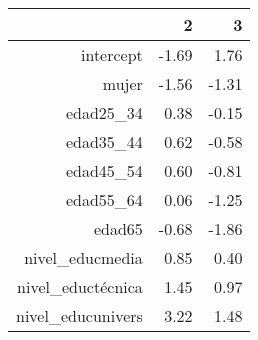 \begin{table}[ht]
\centering
\begin{tabular}{rrr}
  \hline
 & 2 & 3 \\ 
  \hline
intercept & -1.69 & 1.76 \\ 
  mujer & -1.56 & -1.31 \\ 
  edad25\_34 & 0.38 & -0.15 \\ 
  edad35\_44 & 0.62 & -0.58 \\ 
  edad45\_54 & 0.60 & -0.81 \\ 
  edad55\_64 & 0.06 & -1.25 \\ 
  edad65 & -0.68 & -1.86 \\ 
  nivel\_educmedia & 0.85 & 0.40 \\ 
  nivel\_eductécnica & 1.45 & 0.97 \\ 
  nivel\_educunivers & 3.22 & 1.48 \\ 
   \hline
\end{tabular}
\end{table}
